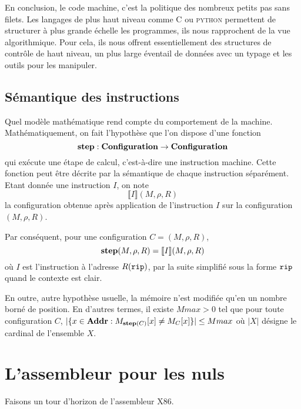 \documentclass{book}
\newcommand{\python}{\textsc{python}\xspace}
\newcommand{\C}{\textsc{C}\xspace}
\newcommand{\rip}{{\tt rip}\xspace}
\newcommand{\Addr}{{\mathbf{Addr}}}
\newcommand{\Configuration}{{\mathbf{Configuration}}}
\newcommand{\sema}[1]{{\llbracket #1 \rrbracket}}
\begin{document}
{En conclusion, le code machine, c'est la politique des nombreux petits pas sans filets.  Les langages de plus haut niveau comme \C ou \python permettent de structurer à plus grande échelle les programmes, ils nous rapprochent de la vue algorithmique.  Pour cela, ils nous offrent essentiellement des structures de contrôle de haut niveau, un plus large éventail de données avec un typage et les outils pour les manipuler. 

\subsection{Sémantique des instructions}

Quel modèle mathématique rend compte du comportement de la machine. Ma\-thé\-matiquement, on fait l'hypothèse que l'on dispose d'une fonction $${\bf step} : \Configuration \to \Configuration$$
qui exécute une étape de calcul, c'est-à-dire une instruction machine. Cette fonction peut être décrite par la sémantique de chaque instruction séparément. Etant donnée une instruction $I$, on note 
$$\sema{I}(M,\rho, R)$$ la configuration obtenue après application de l'instruction $I$ sur la configuration $(M,\rho,R)$. 

Par conséquent, pour une configuration $C = (M,\rho, R)$,  
$${\bf step}(M,\rho,R) = \sema{I}(M,\rho,R)$$ 
où $I$ est l'instruction à l'adresse $R(\rip)$, par la suite simplifié sous la forme $\rip$ quand le contexte est clair.

 
En outre, autre hypothèse usuelle, la mémoire n'est modifiée qu'en un nombre borné de position. En d'autres termes, il existe $Mmax > 0$ tel que pour toute configuration $C$, $|\{x \in \Addr : M_{{\bf step}(C)}[x] \neq M_C[x] \}| \leq Mmax$ où $|X|$ désigne le cardinal de l'ensemble $X$.


\section{L'assembleur pour les nuls}\label{sec:asm}

Faisons un tour d'horizon de l'assembleur X86. 

}
\end{document}
